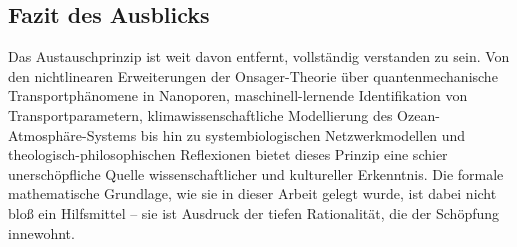 ﻿\documentclass[a4paper,12pt]{article}
\theoremstyle{definition}
\begin{document}
\subsection{Fazit des Ausblicks}

Das Austauschprinzip ist weit davon entfernt, vollständig verstanden zu sein.
Von den nichtlinearen Erweiterungen der Onsager-Theorie über quantenmechanische
Transportphänomene in Nanoporen, maschinell-lernende Identifikation von
Transportparametern, klimawissenschaftliche Modellierung des Ozean-Atmosphäre-Systems
bis hin zu systembiologischen Netzwerkmodellen und theologisch-philosophischen
Reflexionen bietet dieses Prinzip eine schier unerschöpfliche Quelle wissenschaftlicher
und kultureller Erkenntnis. Die formale mathematische Grundlage, wie sie in dieser
Arbeit gelegt wurde, ist dabei nicht bloß ein Hilfsmittel -- sie ist Ausdruck
der tiefen Rationalität, die der Schöpfung innewohnt.
\end{document}
